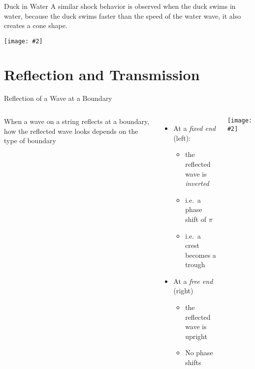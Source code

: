 \documentclass[12pt,aspectratio=169]{beamer}
\newcommand{\pic}[2]{\texttt{[image: \#2]}}
\begin{document}
\begin{frame}{Duck in Water}
  A similar shock behavior is observed when the duck swims in water, because
  the duck swims faster than the speed of the water wave, it also creates a
  cone shape.
  \begin{center}
    \pic{.5}{duck}
  \end{center}

\end{frame}



\section{Reflection and Transmission}

\begin{frame}{Reflection of a Wave at a Boundary}
  \begin{columns}
    When a wave on a string reflects at a boundary, how the reflected wave looks
    depends on the type of boundary
    \begin{itemize}
    \item At a \emph{fixed end} (left):
      \begin{itemize}
      \item the reflected wave is \emph{inverted}
      \item i.e.\ a phase shift of $\pi$
      \item i.e.\ a crest becomes a trough
      \end{itemize}
    \item At a \emph{free end} (right)
      \begin{itemize}
      \item the reflected wave is upright
      \item No phase shifts
      \end{itemize}
    \end{itemize}
    
    \pic1{22}
  \end{columns}
\end{frame}
\end{document}
